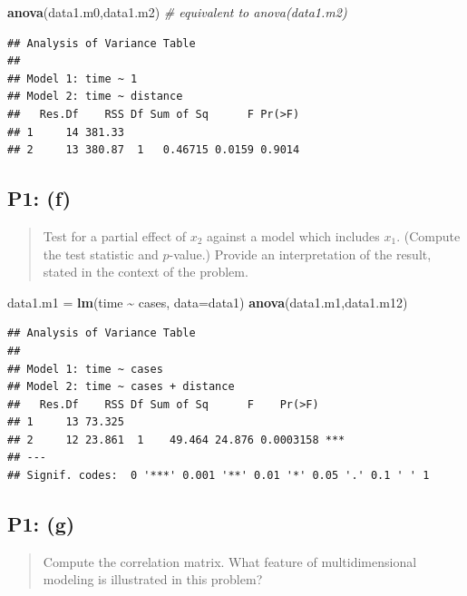 \documentclass[
]{article}
\newenvironment{Shaded}{\begin{snugshade}}{\end{snugshade}}
\newcommand{\AttributeTok}[1]{\textcolor[rgb]{0.13,0.29,0.53}{#1}}
\newcommand{\CommentTok}[1]{\textcolor[rgb]{0.56,0.35,0.01}{\textit{#1}}}
\newcommand{\FunctionTok}[1]{\textcolor[rgb]{0.13,0.29,0.53}{\textbf{#1}}}
\newcommand{\NormalTok}[1]{#1}
\newcommand{\OtherTok}[1]{\textcolor[rgb]{0.56,0.35,0.01}{#1}}
\newcommand{\SpecialCharTok}[1]{\textcolor[rgb]{0.81,0.36,0.00}{\textbf{#1}}}
\begin{document}
\begin{Shaded}
\begin{Highlighting}[]
\FunctionTok{anova}\NormalTok{(data1.m0,data1.m2)  }\CommentTok{\# equivalent to anova(data1.m2)}
\end{Highlighting}
\end{Shaded}

\begin{verbatim}
## Analysis of Variance Table
## 
## Model 1: time ~ 1
## Model 2: time ~ distance
##   Res.Df    RSS Df Sum of Sq      F Pr(>F)
## 1     14 381.33                           
## 2     13 380.87  1   0.46715 0.0159 0.9014
\end{verbatim}

\hypertarget{p1-f}{%
\subsection{P1: (f)}\label{p1-f}}

\begin{quote}
Test for a partial effect of \(x_2\) against a model which includes
\(x_1\). (Compute the test statistic and \(p\)-value.) Provide an
interpretation of the result, stated in the context of the problem.
\end{quote}

\begin{Shaded}
\begin{Highlighting}[]
\NormalTok{data1.m1 }\OtherTok{=} \FunctionTok{lm}\NormalTok{(time }\SpecialCharTok{\textasciitilde{}}\NormalTok{ cases, }\AttributeTok{data=}\NormalTok{data1)}
\FunctionTok{anova}\NormalTok{(data1.m1,data1.m12)}
\end{Highlighting}
\end{Shaded}

\begin{verbatim}
## Analysis of Variance Table
## 
## Model 1: time ~ cases
## Model 2: time ~ cases + distance
##   Res.Df    RSS Df Sum of Sq      F    Pr(>F)    
## 1     13 73.325                                  
## 2     12 23.861  1    49.464 24.876 0.0003158 ***
## ---
## Signif. codes:  0 '***' 0.001 '**' 0.01 '*' 0.05 '.' 0.1 ' ' 1
\end{verbatim}

\hypertarget{p1-g}{%
\subsection{P1: (g)}\label{p1-g}}

\begin{quote}
Compute the correlation matrix. What feature of multidimensional
modeling is illustrated in this problem?
\end{quote}
\end{document}
